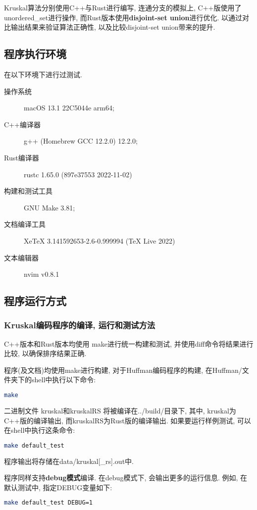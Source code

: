 Kruskal算法分别使用C++与Rust进行编写, 连通分支的模拟上,
C++版使用了unordered\_set进行操作, 而Rust版本使用\textbf{disjoint-set
	union}进行优化. 以通过对比输出结果来验证算法正确性, 以及比较disjoint-set
union带来的提升.

\subsection{程序执行环境}
在以下环境下进行过测试.

\begin{description}
	\item[操作系统] macOS 13.1 22C5044e arm64;
	\item[C++编译器] g++ (Homebrew GCC 12.2.0) 12.2.0;
	\item[Rust编译器] rustc 1.65.0 (897e37553 2022-11-02)
	\item[构建和测试工具] GNU Make 3.81;
	\item[文档编译工具] XeTeX 3.141592653-2.6-0.999994 (TeX Live 2022)
	\item[文本编辑器] nvim v0.8.1
\end{description}

\subsection{程序运行方式}
\subsubsection{Kruskal编码程序的编译, 运行和测试方法}
C++版本和Rust版本均使用 make进行统一构建和测试, 并使用diff命令将结果进行比较,
以确保排序结果正确.\par

程序(及文档)均使用make进行构建, 对于Huffman编码程序的构建, 在Huffman/文件夹下的shell中执行以下命令:
\begin{lstlisting}[language=bash]
make
\end{lstlisting}
二进制文件 kruskal和kruskalRS 将被编译在../build/目录下, 其中,
kruskal为C++版的编译输出, 而kruskalRS为Rust版的编译输出.
如果要运行样例测试, 可以在shell中执行这条命令:

\begin{lstlisting}[language=bash]
make default_test
\end{lstlisting}
程序输出将存储在data/kruskal[\_rs].out中.\par

程序同样支持\textbf{debug模式}编译. 在debug模式下, 会输出更多的运行信息.
例如, 在默认测试中, 指定DEBUG变量如下:
\begin{lstlisting}[language=bash]
make default_test DEBUG=1
\end{lstlisting}

